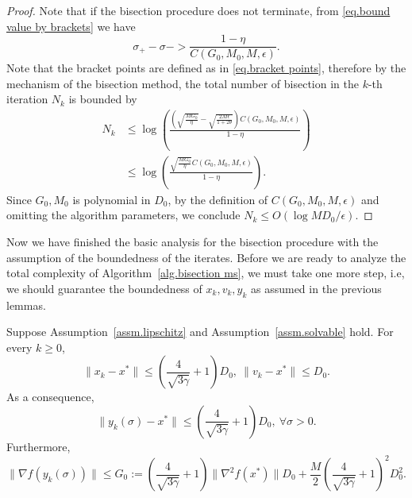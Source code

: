 \documentclass{mcom-l}
\numberwithin{equation}{section}
\begin{document}
\begin{proof}
    Note that if the bisection procedure does not terminate, from \eqref{eq.bound value by brackets} we have
    \begin{equation*}
        \sigma_+-\sigma- > \frac{1-\eta}{ C(G_0,M_0,M,\epsilon)}.
    \end{equation*}
    Note that the bracket points are defined as in \eqref{eq.bracket points}, therefore by the mechanism of the bisection method, the total number of bisection in the $k$-th iteration $N_k$ is bounded by
    \begin{equation*}
        \begin{aligned}
            N_k & \leq \log \left(\frac{\left(\sqrt{\frac{MG_0}{\eta}}-\sqrt{\frac{2M\epsilon}{1+2\theta}}\right)C(G_0,M_0,M,\epsilon)}{1-\eta}\right) \\
                & \leq \log \left(\frac{\sqrt{\frac{MG_0}{\eta}}C(G_0,M_0,M,\epsilon)}{1-\eta}\right).
        \end{aligned}
    \end{equation*}
    Since $G_0,M_0$ is polynomial in $D_0$, by the definition of $C(G_0,M_0,M,\epsilon)$ and omitting the algorithm parameters, we conclude $N_k \leq O\left(\log MD_0/\epsilon\right)$.
\end{proof}
Now we have finished the basic analysis for the bisection procedure with the assumption of the boundedness of the iterates. Before we are ready to analyze the total complexity of Algorithm~\ref{alg.bisection ms}, we must take one more step, i.e, we should guarantee the boundedness of $x_k,v_k,y_k$ as assumed in the previous lemmas.
\begin{lemma}
    \label{lem.bounded iterate}
    Suppose Assumption~\ref{assm.lipschitz} and Assumption~\ref{assm.solvable} hold. For every $k\geq 0$,
    \begin{equation}
        \label{eq.bounded iterate}
        \|x_k- x^*\| \leq \left(\frac{4}{\sqrt{3\gamma}}+1\right)D_0, \ \|v_k-x^*\|\leq D_0.
    \end{equation}
    As a consequence,
    \begin{equation}
        \label{eq.bounded iterate y}
        \|y_k(\sigma)-x^*\| \leq \left(\frac{4}{\sqrt{3\gamma}}+1\right)D_0, \ \forall \sigma>0.
    \end{equation}
    Furthermore,
    \begin{equation}
        \label{eq.ub yk sigma}
        \|\nabla f(y_k(\sigma))\| \leq G_0:= \left(\frac{4}{\sqrt{3\gamma}}+1\right)\|\nabla ^2 f(x^*)\|D_0+\frac{M}{2}\left(\frac{4}{\sqrt{3\gamma}}+1\right)^2 D_0^2.
    \end{equation}
\end{lemma}
\end{document}
